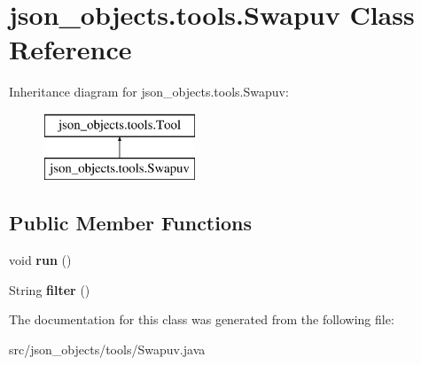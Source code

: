 \hypertarget{classjson__objects_1_1tools_1_1_swapuv}{
\section{json\_\-objects.tools.Swapuv Class Reference}
\label{classjson__objects_1_1tools_1_1_swapuv}
}
Inheritance diagram for json\_\-objects.tools.Swapuv:\begin{figure}[H]
\begin{center}
\leavevmode
\includegraphics[height=2.000000cm]{classjson__objects_1_1tools_1_1_swapuv}
\end{center}
\end{figure}
\subsection*{Public Member Functions}
\begin{DoxyCompactItemize}
\item 
\hypertarget{classjson__objects_1_1tools_1_1_swapuv_a2e6ac5b0002ee74926fab3eaa7df71de}{
void {\bfseries run} ()}
\label{classjson__objects_1_1tools_1_1_swapuv_a2e6ac5b0002ee74926fab3eaa7df71de}

\item 
\hypertarget{classjson__objects_1_1tools_1_1_swapuv_a5709d2c5fd0dfd8bc0e04f37e1e6426b}{
String {\bfseries filter} ()}
\label{classjson__objects_1_1tools_1_1_swapuv_a5709d2c5fd0dfd8bc0e04f37e1e6426b}

\end{DoxyCompactItemize}


The documentation for this class was generated from the following file:\begin{DoxyCompactItemize}
\item 
src/json\_\-objects/tools/Swapuv.java\end{DoxyCompactItemize}
